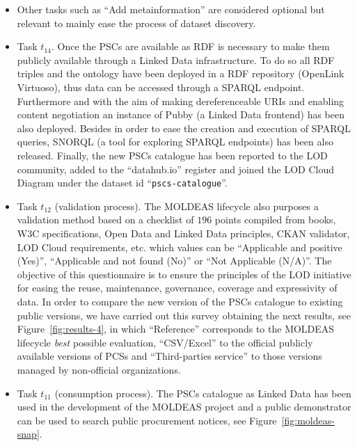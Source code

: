 \begin{itemize}
\item Other tasks such as ``Add metainformation'' are considered optional but relevant to mainly ease the process of dataset discovery.

\item Task $t_{14}$. Once the PSCs are available as RDF is necessary to make them publicly available through a Linked Data infrastructure. To 
do so all RDF triples and the ontology have been deployed in a RDF repository (OpenLink Virtuoso), thus data can be accessed through 
a SPARQL endpoint. Furthermore and with the aim of making dereferenceable URIs and enabling content negotiation an instance 
of Pubby (a Linked Data frontend) has been also deployed. Besides in order to ease the creation and execution of SPARQL queries, SNORQL 
(a tool for exploring SPARQL endpoints) has been also released. Finally, the new PSCs catalogue has been reported to the 
LOD community, added to the ``datahub.io'' register and joined the LOD Cloud Diagram under the dataset id ``\texttt{pscs-catalogue}''.

\item Task $t_{12}$ (validation process). The MOLDEAS lifecycle also purposes a validation method based on a checklist of $196$ points compiled from books, 
W3C specifications, Open Data and Linked Data principles, CKAN validator, LOD Cloud requirements, etc. which values can be 
``Applicable and positive (Yes)'', ``Applicable and not found (No)'' or ``Not Applicable (N/A)''. The objective of this questionnaire is 
to ensure the principles of the LOD initiative for easing the reuse, maintenance, governance, coverage and expressivity of data. In order to compare 
the new version of the PSCs catalogue to existing public versions, we have carried out this survey obtaining the next results, 
see Figure~\ref{fig:results-4}, in which ``Reference'' corresponds to the MOLDEAS lifecycle \textit{best} possible evaluation, ``CSV/Excel'' to the official publicly 
available versions of PCSs and ``Third-parties service'' to those versions managed by non-official organizations. 

\item Task $t_{11}$ (consumption process). The PSCs catalogue as Linked Data has been used in the development of the MOLDEAS project and a 
public demonstrator can be used to search public procurement notices, see Figure~\ref{fig:moldeas-snap}.


\end{itemize}



